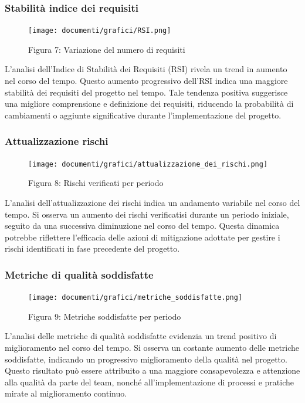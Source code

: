 \documentclass{article}
\begin{document}
{\subsubsection{Stabilità indice dei requisiti}
\begin{figure}[H]
    \centering
    \texttt{[image: documenti/grafici/RSI.png]}
    \caption{Figura 7: Variazione del numero di requisiti}
    \end{figure}
    L'analisi dell'Indice di Stabilità dei Requisiti (RSI) rivela un trend in aumento nel corso del tempo. Questo aumento progressivo dell'RSI indica una maggiore stabilità dei requisiti del progetto nel tempo. Tale tendenza positiva suggerisce una migliore comprensione e definizione dei requisiti, riducendo la probabilità di cambiamenti o aggiunte significative durante l'implementazione del progetto.
\subsubsection{Attualizzazione rischi}
\begin{figure}[H]
    \centering
    \texttt{[image: documenti/grafici/attualizzazione\_dei\_rischi.png]}
    \caption{Figura 8: Rischi verificati per periodo}
    \end{figure}
    L'analisi dell'attualizzazione dei rischi indica un andamento variabile nel corso del tempo. Si osserva un aumento dei rischi verificatisi durante un periodo iniziale, seguito da una successiva diminuzione nel corso del tempo. Questa dinamica potrebbe riflettere l'efficacia delle azioni di mitigazione adottate per gestire i rischi identificati in fase precedente del progetto.
\subsubsection{Metriche di qualità soddisfatte}
\begin{figure}[H]
    \centering
    \texttt{[image: documenti/grafici/metriche\_soddisfatte.png]}
    \caption{Figura 9: Metriche soddisfatte per periodo}
    \end{figure}
    L'analisi delle metriche di qualità soddisfatte evidenzia un trend positivo di miglioramento nel corso del tempo. Si osserva un costante aumento delle metriche soddisfatte, indicando un progressivo miglioramento della qualità nel progetto. Questo risultato può essere attribuito a una maggiore consapevolezza e attenzione alla qualità da parte del team, nonché all'implementazione di processi e pratiche mirate al miglioramento continuo.

}
\end{document}
